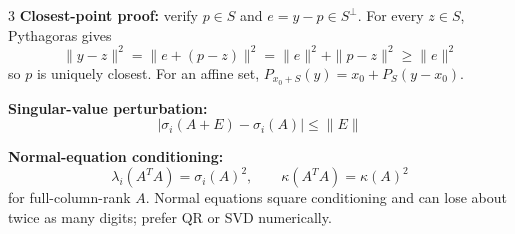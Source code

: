 \documentclass[10pt]{article}
\newcommand{\sub}[1]{\textbf{#1}}
\begin{document}
\begin{multicols*}{3}
\sub{Closest-point proof:} verify \(p\in S\) and
\(e=y-p\in S^\perp\). For every \(z\in S\), Pythagoras gives
\[
\|y-z\|^2=\|e+(p-z)\|^2
=\|e\|^2+\|p-z\|^2\ge\|e\|^2
\]
so \(p\) is uniquely closest. For an affine set,
\(P_{x_0+S}(y)=x_0+P_S(y-x_0)\).

\sub{Singular-value perturbation:}
\[
|\sigma_i(A+E)-\sigma_i(A)|\le\|E\|
\]

\sub{Normal-equation conditioning:}
\[
\lambda_i(A^TA)=\sigma_i(A)^2,\qquad
\kappa(A^TA)=\kappa(A)^2
\]
for full-column-rank \(A\). Normal equations square conditioning and can
lose about twice as many digits; prefer QR or SVD numerically.

\end{multicols*}
\end{document}
